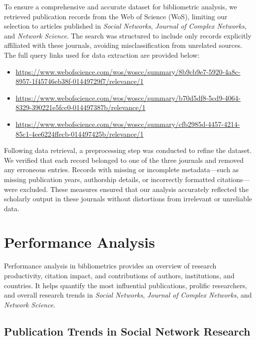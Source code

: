 \documentclass[twocolumn]{article}
\begin{document}
	To ensure a comprehensive and accurate dataset for bibliometric analysis, we retrieved publication records from the Web of Science (WoS), limiting our selection to articles published in \textit{Social Networks}, \textit{Journal of Complex Networks}, and \textit{Network Science}. The search was structured to include only records explicitly affiliated with these journals, avoiding misclassification from unrelated sources. The full query links used for data extraction are provided below:
	\begin{itemize}
		\item \url{https://www.webofscience.com/wos/woscc/summary/8b9cb9e7-5920-4a8c-8957-1f45746eb38f-01449729f7/relevance/1}
		\item 	\url{https://www.webofscience.com/wos/woscc/summary/b70d5df8-5cd9-4064-8329-390221e5fcc0-014497387b/relevance/1}
		\item 	\url{https://www.webofscience.com/wos/woscc/summary/cfb2985d-4457-4214-85c1-4ee6224ffecb-014497425b/relevance/1}
	\end{itemize}
	
	Following data retrieval, a preprocessing step was conducted to refine the dataset. We verified that each record belonged to one of the three journals and removed any erroneous entries. Records with missing or incomplete metadata—such as missing publication years, authorship details, or incorrectly formatted citations—were excluded. These measures ensured that our analysis accurately reflected the scholarly output in these journals without distortions from irrelevant or unreliable data.
	
	
	\section{Performance Analysis}\label{Performance Analysis}
	
	Performance analysis in bibliometrics provides an overview of research productivity, citation impact, and contributions of authors, institutions, and countries. It helps quantify the most influential publications, prolific researchers, and overall research trends in \textit{Social Networks}, \textit{Journal of Complex Networks}, and \textit{Network Science}.
	
	\subsection{Publication Trends in Social Network Research}
	
\end{document}
